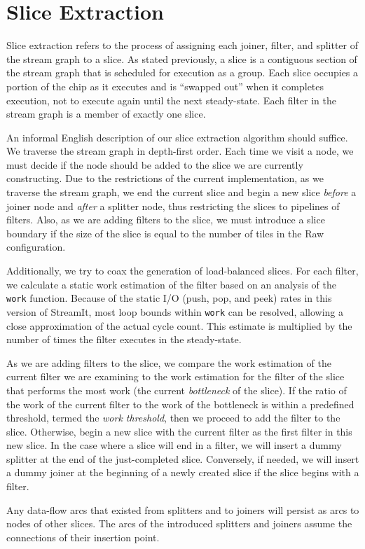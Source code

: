 \section{Slice Extraction}
\label{sec:extract}
Slice extraction refers to the process of assigning each joiner,
filter, and splitter of the stream graph to a slice.  As stated
previously, a slice is a contiguous section of the stream graph that
is scheduled for execution as a group. Each slice occupies a portion
of the chip as it executes and is ``swapped out'' when it completes
execution, not to execute again until the next steady-state.  Each
filter in the stream graph is a member of exactly one slice.

An informal English description of our slice extraction algorithm
should suffice.  We traverse the stream graph in depth-first order.
Each time we visit a node, we must decide if the node should be added
to the slice we are currently constructing.  Due to the restrictions
of the current implementation, as we traverse the stream graph, we end
the current slice and begin a new slice {\it before} a joiner node and
{\it after} a splitter node, thus restricting the slices to pipelines
of filters.  Also, as we are adding filters to the slice, we must
introduce a slice boundary if the size of the slice is equal to the
number of tiles in the Raw configuration. 

Additionally, we try to coax the generation of load-balanced slices.
For each filter, we calculate a static work estimation of the filter
based on an analysis of the {\tt work} function.  Because of the
static I/O (push, pop, and peek) rates in this version of StreamIt,
most loop bounds within {\tt work} can be resolved, allowing a close
approximation of the actual cycle count.  This estimate is multiplied
by the number of times the filter executes in the steady-state.

As we are adding filters to the slice, we compare the work estimation
of the current filter we are examining to the work estimation for the
filter of the slice that performs the most work (the current {\it
bottleneck} of the slice).  If the ratio of the work of the current
filter to the work of the bottleneck is within a predefined
threshold, termed the {\it work threshold}, then we proceed to add the
filter to the slice.  Otherwise, begin a new slice with the current
filter as the first filter in this new slice. In the case where a
slice will end in a filter, we will insert a dummy splitter at the end
of the just-completed slice.  Conversely, if needed, we will insert a
dummy joiner at the beginning of a newly created slice if the slice
begins with a filter.

Any data-flow arcs that existed from splitters and to joiners will
persist as arcs to nodes of other slices.  The arcs of the introduced
splitters and joiners assume the connections of their insertion point.

